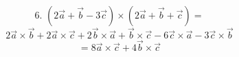 \documentclass{article}
\begin{document}
\[ \text{6. } (2\vec{a} + \vec{b} - 3\vec{c}) \times (2\vec{a} + \vec{b}+ \vec{c}) = \]
\[ 2\vec{a} \times \vec{b} + 2\vec{a} \times \vec{c} + 2\vec{b} \times \vec{a} + \vec{b} \times \vec{c} - 6\vec{c} \times \vec{a} - 3\vec{c} \times \vec{b} \]
\[ = 8\vec{a} \times \vec{c} + 4\vec{b} \times \vec{c} \]
\end{document}
